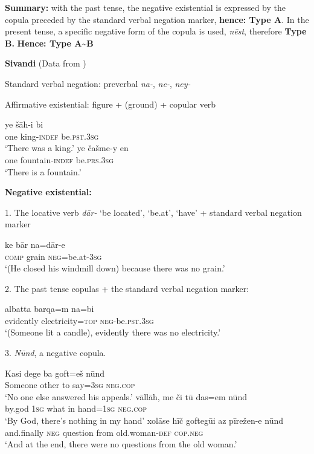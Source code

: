 ﻿\documentclass[output=paper]{langsci/langscibook}
\begin{document}
\begin{unindented}
\textbf{Summary:} with the past tense, the negative existential is expressed by the copula preceded by the standard verbal negation marker, \textbf{hence: Type A}. In the present tense, a specific negative form of the copula is used, \textit{nēst}, therefore \textbf{Type B.} \textbf{Hence: Type A{\textasciitilde}B}
%

\textbf{Sivandi} (Data from \citealt{Lecoq1979}) 

Standard verbal negation: preverbal \textit{na-}, \textit{ne-}, \textit{ney-} 

Affirmative existential: figure + (ground) + copular verb
%
\begin{exe}\ex
    \gll ye šāh-i bi \\
one  king-\textsc{indef}    be.\textsc{pst}.\textsc{3sg} \\
    \glt `There was a king.' \citep[107]{Lecoq1979}
\ex \gll ye   čašme-y      en \\
one  fountain-\textsc{indef}   be.\textsc{prs.3sg} \\
    \glt `There is a fountain.' \citep[127]{Lecoq1979}
    \end{exe}

\textbf{Negative existential:}

1. The locative verb \textit{dār-} `be located', `be.at', `have' + standard verbal negation marker
%
\begin{exe}\ex
    \gll ke   bār   na=dār-e \\
\textsc{comp}   grain  \textsc{neg}=be.at-\textsc{3sg} \\
    \glt `(He closed his windmill down) because there was no grain.' \citep[150]{Lecoq1979}
    \end{exe} 

2. The past tense copulas + the standard verbal negation marker:
%
\begin{exe}\ex
    \gll albatta      barqa=m          na=bi \\
evidently  electricity=\textsc{top} \textsc{neg}-be.\textsc{pst.3sg} \\
    \glt `(Someone lit a candle), evidently there was no electricity.' \citep[89]{Lecoq1979}
    \end{exe}
3. \textit{Nūnd}, a negative copula.
%
\begin{exe}\ex
    \gll Kasi dege  ba goft=eš    nūnd           \\
Someone other to say=\textsc{3sg}  \textsc{neg}.\textsc{cop}  \\
    \glt `No one else answered his appeals.' \citep[95]{Lecoq1979}
\ex \gll vāllāh, me    či      tū  das=em      nūnd \\
by.god  \textsc{1sg}   what in hand=\textsc{1sg}    \textsc{neg.cop} \\
    \glt `By God, there's nothing in my hand' \citep[150]{Lecoq1979}
\ex \gll xolāse hīč    goftegūi  az      pīrežen-e          nūnd \\
and.finally \textsc{neg}  question from  old.woman-\textsc{def}   \textsc{cop.neg} \\
    \glt `And at the end, there were no questions from the old woman.' \citep[108]{Lecoq1979}
    \end{exe}


\end{unindented}
\end{document}
